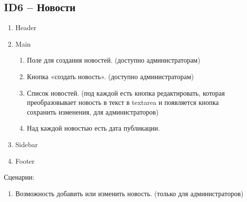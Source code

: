 \documentclass[a4paper]{article}
\begin{document}
		\subsection{ID6 – Новости}
			\begin{enumerate}
				\item Header
				\item Main
				\begin{enumerate}
					\item Поле для создания новостей. (доступно администраторам)
					\item Кнопка «создать новость». (доступно администраторам)
					\item Список новостей. (под каждой есть кнопка редактировать, которая преобразовывает новость в текст в textarea и появляется кнопка сохранить изменения, для администраторов)
					\item Над каждой новостью есть дата публикации.
				\end{enumerate}
				\item Sidebar
				\item Footer
			\end{enumerate}
			\large{Сценарии:}
				\begin{enumerate}
					\item Возможность добавить или изменить новость. (только для администраторов)
				\end{enumerate}
		\newpage
\end{document}
